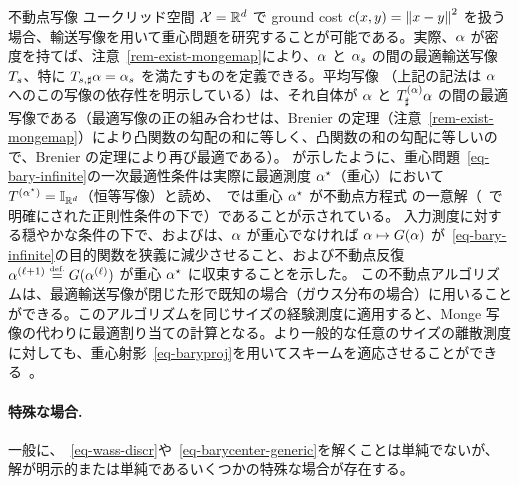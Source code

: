 \begin{rem2}{不動点写像}
ユークリッド空間 $\mathcal{X}=\mathbb{R}^d$ で ground cost $c(x,y)=\left\| x-y \right\|^2$ を扱う場合、輸送写像を用いて重心問題を研究することが可能である。実際、$\alpha$ が密度を持てば、注意~\ref{rem-exist-mongemap}により、$\alpha$ と $\alpha_s$ の間の最適輸送写像 $T_s$、特に $T_{s,\sharp}\alpha = \alpha_s$ を満たすものを定義できる。平均写像
（上記の記法は $\alpha$ へのこの写像の依存性を明示している）は、それ自体が $\alpha$ と $T^{(\alpha)}_\sharp \alpha$ の間の最適写像である（最適写像の正の組み合わせは、Brenier の定理（注意~\ref{rem-exist-mongemap}）により凸関数の勾配の和に等しく、凸関数の和の勾配に等しいので、Brenier の定理により再び最適である）。
\citet{Carlier_wasserstein_barycenter}が示したように、重心問題~\eqref{eq-bary-infinite}の一次最適性条件は実際に最適測度 $\alpha^\star$（重心）において $T^{(\alpha^\star)}=\mathbb{I}_{\mathbb{R}^d}$（恒等写像）と読め、~\citep{alvarez2016fixed}では重心 $\alpha^\star$ が不動点方程式
の一意解（~\citep[Theo. 2]{zemel2017fr}で明確にされた正則性条件の下で）であることが示されている。
入力測度に対する穏やかな条件の下で、\citet{alvarez2016fixed}および\citet{zemel2017fr}は、$\alpha$ が重心でなければ $\alpha \mapsto G(\alpha)$ が~\eqref{eq-bary-infinite}の目的関数を狭義に減少させること、および不動点反復 $\alpha^{(\ell+1)} \stackrel{\mbox{\upshape\tiny def.}}{=} G( \alpha^{(\ell)} )$ が重心 $\alpha^\star$ に収束することを示した。
この不動点アルゴリズムは、最適輸送写像が閉じた形で既知の場合（\eg ガウス分布の場合）に用いることができる。このアルゴリズムを同じサイズの経験測度に適用すると、Monge 写像の代わりに最適割り当ての計算となる。より一般的な任意のサイズの離散測度に対しても、重心射影~\eqref{eq-baryproj}を用いてスキームを適応させることができる~\citep{CuturiBarycenter}。
\end{rem2}



\paragraph{特殊な場合.}

一般に、~\eqref{eq-wass-discr}や~\eqref{eq-barycenter-generic}を解くことは単純でないが、解が明示的または単純であるいくつかの特殊な場合が存在する。


